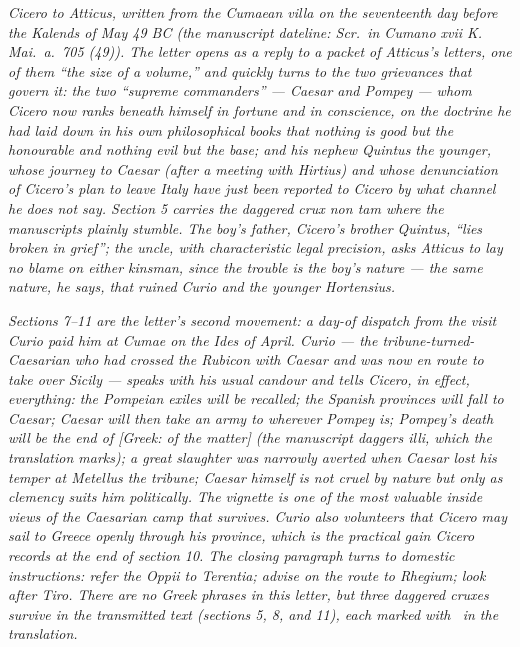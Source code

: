 
\textit{Cicero to Atticus, written from the Cumaean villa on
the seventeenth day before the Kalends of May 49 BC (the
manuscript dateline: \textit{Scr.\ in Cumano xvii K. Mai.\
a.\ 705 (49)}). The letter opens as a reply to a packet of
Atticus's letters, one of them ``the size of a volume,''
and quickly turns to the two grievances that govern it: the
two ``supreme commanders'' --- Caesar and Pompey --- whom
Cicero now ranks beneath himself in fortune and in
conscience, on the doctrine he had laid down in his own
philosophical books that nothing is good but the honourable
and nothing evil but the base; and his nephew Quintus the
younger, whose journey to Caesar (after a meeting with
Hirtius) and whose denunciation of Cicero's plan to leave
Italy have just been reported to Cicero by what channel he
does not say. Section 5 carries the daggered crux
\textit{non tam} where the manuscripts plainly stumble. The
boy's father, Cicero's brother Quintus, ``lies broken in
grief''; the uncle, with characteristic legal precision,
asks Atticus to lay no blame on either kinsman, since the
trouble is the boy's nature --- the same nature, he says,
that ruined Curio and the younger Hortensius.}

\textit{Sections 7--11 are the letter's second movement: a
day-of dispatch from the visit Curio paid him at Cumae on
the Ides of April. Curio --- the tribune-turned-Caesarian
who had crossed the Rubicon with Caesar and was now en
route to take over Sicily --- speaks with his usual candour
and tells Cicero, in effect, everything: the Pompeian
exiles will be recalled; the Spanish provinces will fall to
Caesar; Caesar will then take an army to wherever Pompey
is; Pompey's death will be the end of \textit{[Greek: of
the matter]} (the manuscript daggers \textit{illi}, which
the translation marks); a great slaughter was narrowly
averted when Caesar lost his temper at Metellus the
tribune; Caesar himself is not cruel by nature but only as
clemency suits him politically. The vignette is one of the
most valuable inside views of the Caesarian camp that
survives. Curio also volunteers that Cicero may sail to
Greece openly through his province, which is the practical
gain Cicero records at the end of section 10. The closing
paragraph turns to domestic instructions: refer the Oppii
to Terentia; advise on the route to Rhegium; look after
Tiro. There are no Greek phrases in this letter, but three
daggered cruxes survive in the transmitted text (sections
5, 8, and 11), each marked with \textdagger\ in the
translation.}
